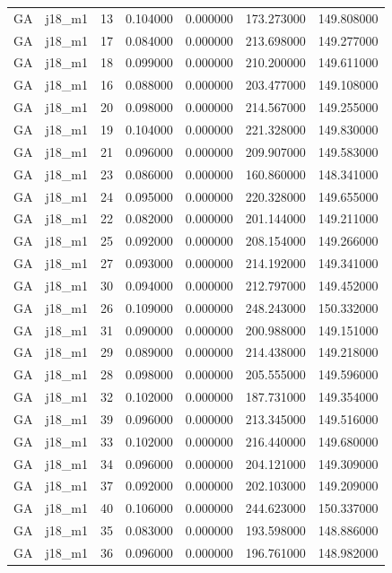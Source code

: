 \begin{tabular}{llrrrrr}
GA & j18_m1 & 13 & 0.104000 & 0.000000 & 173.273000 & 149.808000 \\
GA & j18_m1 & 17 & 0.084000 & 0.000000 & 213.698000 & 149.277000 \\
GA & j18_m1 & 18 & 0.099000 & 0.000000 & 210.200000 & 149.611000 \\
GA & j18_m1 & 16 & 0.088000 & 0.000000 & 203.477000 & 149.108000 \\
GA & j18_m1 & 20 & 0.098000 & 0.000000 & 214.567000 & 149.255000 \\
GA & j18_m1 & 19 & 0.104000 & 0.000000 & 221.328000 & 149.830000 \\
GA & j18_m1 & 21 & 0.096000 & 0.000000 & 209.907000 & 149.583000 \\
GA & j18_m1 & 23 & 0.086000 & 0.000000 & 160.860000 & 148.341000 \\
GA & j18_m1 & 24 & 0.095000 & 0.000000 & 220.328000 & 149.655000 \\
GA & j18_m1 & 22 & 0.082000 & 0.000000 & 201.144000 & 149.211000 \\
GA & j18_m1 & 25 & 0.092000 & 0.000000 & 208.154000 & 149.266000 \\
GA & j18_m1 & 27 & 0.093000 & 0.000000 & 214.192000 & 149.341000 \\
GA & j18_m1 & 30 & 0.094000 & 0.000000 & 212.797000 & 149.452000 \\
GA & j18_m1 & 26 & 0.109000 & 0.000000 & 248.243000 & 150.332000 \\
GA & j18_m1 & 31 & 0.090000 & 0.000000 & 200.988000 & 149.151000 \\
GA & j18_m1 & 29 & 0.089000 & 0.000000 & 214.438000 & 149.218000 \\
GA & j18_m1 & 28 & 0.098000 & 0.000000 & 205.555000 & 149.596000 \\
GA & j18_m1 & 32 & 0.102000 & 0.000000 & 187.731000 & 149.354000 \\
GA & j18_m1 & 39 & 0.096000 & 0.000000 & 213.345000 & 149.516000 \\
GA & j18_m1 & 33 & 0.102000 & 0.000000 & 216.440000 & 149.680000 \\
GA & j18_m1 & 34 & 0.096000 & 0.000000 & 204.121000 & 149.309000 \\
GA & j18_m1 & 37 & 0.092000 & 0.000000 & 202.103000 & 149.209000 \\
GA & j18_m1 & 40 & 0.106000 & 0.000000 & 244.623000 & 150.337000 \\
GA & j18_m1 & 35 & 0.083000 & 0.000000 & 193.598000 & 148.886000 \\
GA & j18_m1 & 36 & 0.096000 & 0.000000 & 196.761000 & 148.982000 \\

\end{tabular}
